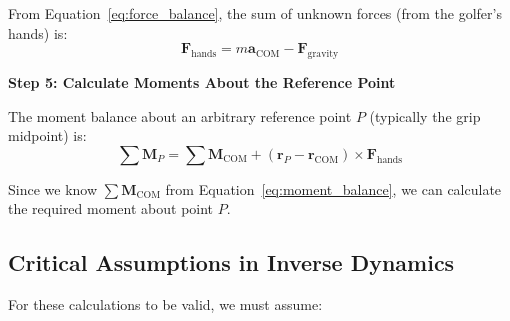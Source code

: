 \documentclass[11pt,a4paper]{article}
\newcommand{\bvec}[1]{\mathbf{#1}}
\theoremstyle{definition}
\theoremstyle{plain}
\begin{document}
From Equation~\ref{eq:force_balance}, the sum of unknown forces (from the golfer's hands) is:
\begin{equation}
\bvec{F}_{\text{hands}} = m\bvec{a}_{\text{COM}} - \bvec{F}_{\text{gravity}}
\end{equation}

\vspace{3mm}

\textbf{Step 5: Calculate Moments About the Reference Point}

\vspace{3mm}

The moment balance about an arbitrary reference point $P$ (typically the grip midpoint) is:
\begin{equation}
\sum \bvec{M}_{P} = \sum \bvec{M}_{\text{COM}} + (\bvec{r}_{P} - \bvec{r}_{\text{COM}}) \times \bvec{F}_{\text{hands}}
\end{equation}

Since we know $\sum \bvec{M}_{\text{COM}}$ from Equation~\ref{eq:moment_balance}, we can calculate the required moment about point $P$.

\subsection{Critical Assumptions in Inverse Dynamics}

For these calculations to be valid, we must assume:
\end{document}
